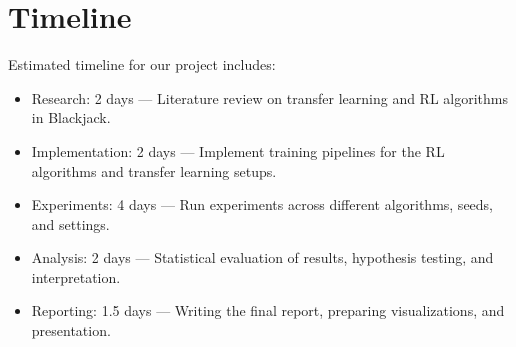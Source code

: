 \documentclass{article}
\begin{document}
\section{Timeline}
Estimated timeline for our project includes:
\begin{itemize}
    \item Research: 2 days — Literature review on transfer learning and RL algorithms in Blackjack.
    \item Implementation: 2 days — Implement training pipelines for the RL algorithms and transfer learning setups.
    \item Experiments: 4 days — Run experiments across different algorithms, seeds, and settings.
    \item Analysis: 2 days — Statistical evaluation of results, hypothesis testing, and interpretation.
    \item Reporting: 1.5 days — Writing the final report, preparing visualizations, and presentation.
\end{itemize}
\end{document}
